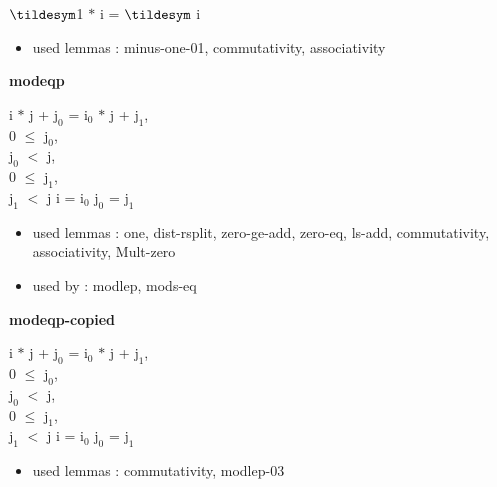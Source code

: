 \documentclass[a4paper]{article}
\begin{document}
\medskip

 \Fol $\tildesym$1 $*$ i = $\tildesym$ i

\begin{itemize}


\item       used lemmas  : minus-one-01, commutativity, associativity

\end{itemize}

\medskip

\bigskip

{\large\bf modeqp}

\medskip

i $*$ j + $\mbox{j}_{0}$ = $\mbox{i}_{0}$ $*$ j + $\mbox{j}_{1}$, \\
0 $\le$ $\mbox{j}_{0}$, \\
$\mbox{j}_{0}$ $<$ j, \\
0 $\le$ $\mbox{j}_{1}$, \\
$\mbox{j}_{1}$ $<$ j \Fol i = $\mbox{i}_{0}$ \And $\mbox{j}_{0}$ = $\mbox{j}_{1}$

\begin{itemize}


\item       used lemmas  : one, dist-rsplit, zero-ge-add, zero-eq, ls-add, commutativity, associativity, Mult-zero
\item       used by      : modlep, mods-eq

\end{itemize}

\medskip

\bigskip

{\large\bf modeqp-copied}

\medskip

i $*$ j + $\mbox{j}_{0}$ = $\mbox{i}_{0}$ $*$ j + $\mbox{j}_{1}$, \\
0 $\le$ $\mbox{j}_{0}$, \\
$\mbox{j}_{0}$ $<$ j, \\
0 $\le$ $\mbox{j}_{1}$, \\
$\mbox{j}_{1}$ $<$ j \Fol i = $\mbox{i}_{0}$ \And $\mbox{j}_{0}$ = $\mbox{j}_{1}$

\begin{itemize}


\item       used lemmas  : commutativity, modlep-03

\end{itemize}

\medskip
\end{document}
